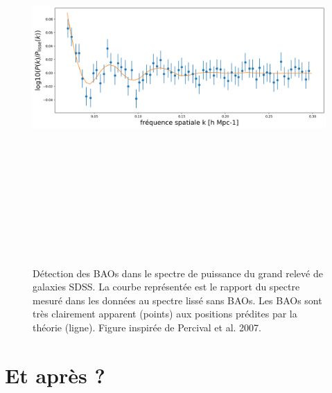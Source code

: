 \begin{figure}[htbp]
	\centering
		\includegraphics[height=15cm]{figs/percival.png}
		\caption[Les BAOs dans les relevés de galaxies]{Détection des BAOs dans le spectre de puissance du grand relevé de galaxies SDSS. La courbe représentée est le rapport du spectre mesuré dans les données au spectre lissé sans BAOs. Les BAOs sont très clairement apparent (points) aux positions prédites par la théorie (ligne). Figure inspirée de Percival et al. 2007.}
	\label{f:percival}
\end{figure}

\section{Et après ?}

